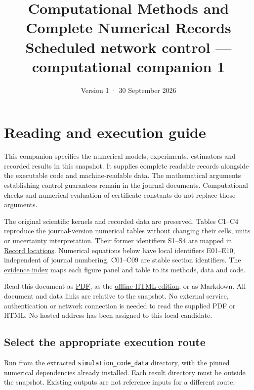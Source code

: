 \documentclass[11pt,a4paper]{article}
\title{\textbf{Computational Methods and Complete Numerical
Records}\\[6pt]\large Scheduled network control --- computational
companion 1}
\author{}\date{Version 1 · 30 September 2026}
\begin{document}
\maketitle
\thispagestyle{fancy}
\tableofcontents
\clearpage
\section{Reading and execution guide}\label{guide}

This companion specifies the numerical models, experiments, estimators
and recorded results in this snapshot. It supplies complete readable
records alongside the executable code and machine-readable data. The
mathematical arguments establishing control guarantees remain in the
journal documents. Computational checks and numerical evaluation of
certificate constants do not replace those arguments.

The original scientific kernels and recorded data are preserved. Tables
C1--C4 reproduce the journal-version numerical tables without changing
their cells, units or uncertainty interpretation. Their former
identifiers S1--S4 are mapped in \href{RECORD_LOCATIONS.md}{Record
locations}. Numerical equations below have local identifiers E01--E10,
independent of journal numbering. C01--C09 are stable section
identifiers. The \href{EVIDENCE_INDEX.md}{evidence index} maps each
figure panel and table to its methods, data and code.

Read this document as \href{COMPUTATIONAL_COMPANION.pdf}{PDF}, as the
\href{COMPUTATIONAL_COMPANION.html}{offline HTML edition}, or as
Markdown. All document and data links are relative to the snapshot. No
external service, authentication or network connection is needed to read
the supplied PDF or HTML. No hosted address has been assigned to this
local candidate.

\subsection{Select the appropriate execution
route}\label{select-the-appropriate-execution-route}

Run from the extracted \texttt{simulation\_code\_data} directory, with
the pinned numerical dependencies already installed. Each result
directory must be outside the snapshot. Existing outputs are not
reference inputs for a different route.
\end{document}
